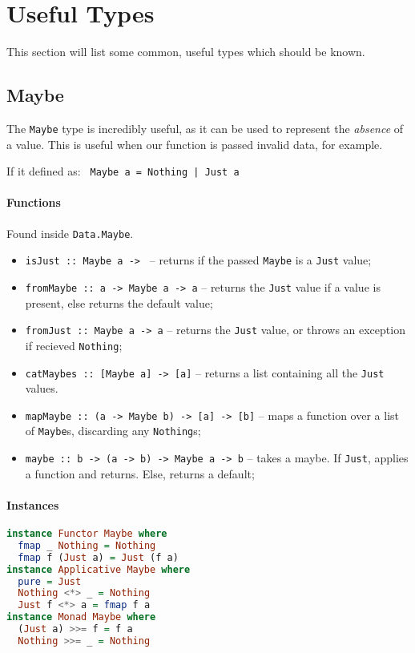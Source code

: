 \section{Useful Types}
This section will list some common, useful types which should be known.

\subsection{Maybe}
The \texttt{Maybe} type is incredibly useful, as it can be used to represent the \textit{absence} of a value. This is useful when our function is passed invalid data, for example.

If it defined as: \texttt{ Maybe a = Nothing | Just a}

\paragraph{Functions}
Found inside \texttt{Data.Maybe}.
\begin{itemize}
  \item \texttt{isJust :: Maybe a -> } -- returns if the passed \texttt{Maybe} is a \texttt{Just} value;
  \item \texttt{fromMaybe :: a -> Maybe a -> a} -- returns the \texttt{Just} value if a value is present, else returns the default value;
  \item \texttt{fromJust :: Maybe a -> a} -- returns the \texttt{Just} value, or throws an exception if recieved \texttt{Nothing};
  \item \texttt{catMaybes :: [Maybe a] -> [a]} -- returns a list containing all the \texttt{Just} values.
  \item \texttt{mapMaybe :: (a -> Maybe b) -> [a] -> [b]} -- maps a function over a list of \texttt{Maybe}s, discarding any \texttt{Nothing}s;
  \item \texttt{maybe :: b -> (a -> b) -> Maybe a -> b} -- takes a maybe. If \texttt{Just}, applies a function and returns. Else, returns a default;
\end{itemize}

\paragraph{Instances}
\begin{lstlisting}[language=haskell]
instance Functor Maybe where
  fmap _ Nothing = Nothing
  fmap f (Just a) = Just (f a)
instance Applicative Maybe where
  pure = Just
  Nothing <*> _ = Nothing
  Just f <*> a = fmap f a
instance Monad Maybe where
  (Just a) >>= f = f a
  Nothing >>= _ = Nothing
\end{lstlisting}

